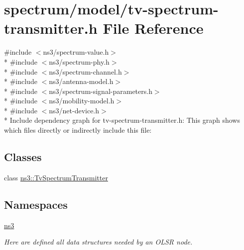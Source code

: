 \hypertarget{tv-spectrum-transmitter_8h}{}\section{spectrum/model/tv-\/spectrum-\/transmitter.h File Reference}
\label{tv-spectrum-transmitter_8h}
{\ttfamily \#include $<$ns3/spectrum-\/value.\+h$>$}\\*
{\ttfamily \#include $<$ns3/spectrum-\/phy.\+h$>$}\\*
{\ttfamily \#include $<$ns3/spectrum-\/channel.\+h$>$}\\*
{\ttfamily \#include $<$ns3/antenna-\/model.\+h$>$}\\*
{\ttfamily \#include $<$ns3/spectrum-\/signal-\/parameters.\+h$>$}\\*
{\ttfamily \#include $<$ns3/mobility-\/model.\+h$>$}\\*
{\ttfamily \#include $<$ns3/net-\/device.\+h$>$}\\*
Include dependency graph for tv-\/spectrum-\/transmitter.h\+:
This graph shows which files directly or indirectly include this file\+:
\subsection*{Classes}
\begin{DoxyCompactItemize}
\item 
class \hyperlink{classns3_1_1TvSpectrumTransmitter}{ns3\+::\+Tv\+Spectrum\+Transmitter}
\end{DoxyCompactItemize}
\subsection*{Namespaces}
\begin{DoxyCompactItemize}
\item 
 \hyperlink{namespacens3}{ns3}
\begin{DoxyCompactList}\small\item\em Here are defined all data structures needed by an O\+L\+SR node. \end{DoxyCompactList}\end{DoxyCompactItemize}
